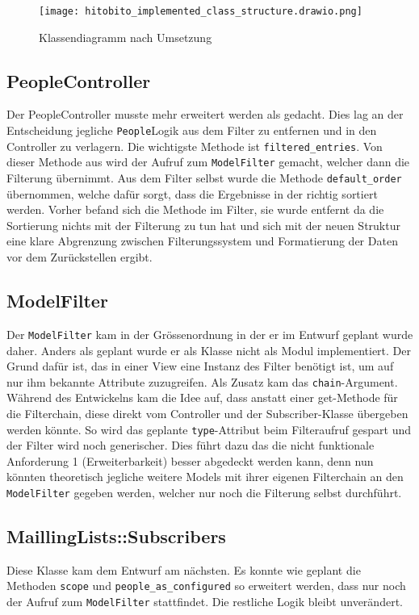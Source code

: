 \begin{landscape}
   \begin{figure}[h]
      \centering
      \texttt{[image: hitobito\_implemented\_class\_structure.drawio.png]}
      \caption{Klassendiagramm nach Umsetzung}
   \end{figure}

   \subsection{PeopleController}
   Der PeopleController musste mehr erweitert werden als gedacht. Dies lag an der Entscheidung
   jegliche \texttt{People}\-Logik aus dem Filter zu entfernen und in den Controller zu verlagern. Die wichtigste Methode ist \texttt{filtered\_entries}.
   Von dieser Methode aus wird der Aufruf zum \texttt{ModelFilter} gemacht, welcher dann die Filterung übernimmt. Aus dem Filter selbst wurde die Methode
   \texttt{default\_order} übernommen, welche dafür sorgt, dass die Ergebnisse in der richtig sortiert werden. Vorher befand sich die Methode im Filter, sie wurde entfernt da die Sortierung nichts mit der Filterung zu
   tun hat und sich mit der neuen Struktur eine klare Abgrenzung zwischen Filterungssystem und Formatierung der Daten vor dem Zurückstellen ergibt.  
\end{landscape}

\subsection{ModelFilter}
Der \texttt{ModelFilter} kam in der Grössenordnung in der er im Entwurf geplant wurde daher. Anders als geplant wurde er als Klasse nicht als Modul implementiert. Der Grund dafür ist,
das in einer View eine Instanz des Filter benötigt ist, um auf nur ihm bekannte Attribute zuzugreifen. Als Zusatz kam das \texttt{chain}-Argument. Während des Entwickelns kam die Idee auf, dass anstatt einer get-Methode für die Filterchain,
diese direkt vom Controller und der Subscriber-Klasse übergeben werden könnte. So wird das geplante \texttt{type}-Attribut beim Filteraufruf gespart und der Filter wird noch generischer. Dies führt dazu das 
die nicht funktionale Anforderung 1 (Erweiterbarkeit) besser abgedeckt werden kann, denn nun könnten theoretisch jegliche weitere Models mit ihrer eigenen Filterchain an den \texttt{ModelFilter} gegeben werden, welcher nur noch die Filterung selbst durchführt.

\subsection{MaillingLists::Subscribers}
Diese Klasse kam dem Entwurf am nächsten. Es konnte wie geplant die Methoden \texttt{scope} und \texttt{people\_as\_configured} so erweitert werden, dass nur noch der Aufruf zum \texttt{ModelFilter} stattfindet. Die restliche Logik bleibt unverändert. 


